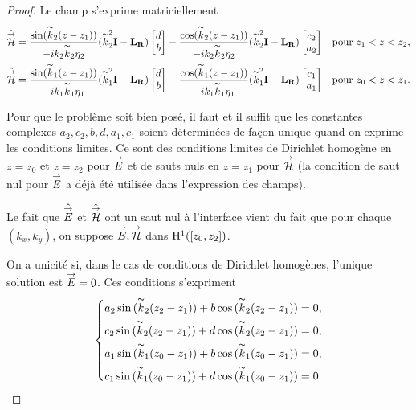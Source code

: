 \begin{proof}
      Le champ s'exprime matriciellement
      \begin{align*}
        \hat{\vH} &= \frac{\sin(\kk_2(z-z_1))}{-i k_2\kk_2 \eta_2}(\kk_2^2 \mI - \mLR)\begin{bmatrix}d \\ b\end{bmatrix} - \frac{\cos(\kk_2(z-z_1))}{-i k_2\kk_2 \eta_2}(\kk_2^2 \mI - \mLR)\begin{bmatrix}c_2 \\ a_2\end{bmatrix} && \text{pour } z_1 < z < z_2,
        \\
        \hat{\vH} &= \frac{\sin(\kk_1(z-z_1))}{-i k_1\kk_1 \eta_1}(\kk_1^2 \mI - \mLR)\begin{bmatrix}d \\ b\end{bmatrix} - \frac{\cos(\kk_1(z-z_1))}{-i k_1\kk_1 \eta_1}(\kk_1^2 \mI - \mLR)\begin{bmatrix}c_1 \\ a_1\end{bmatrix} && \text{pour } z_0 < z < z_1.
      \end{align*}

      Pour que le problème soit bien posé, il faut et il suffit que les constantes complexes \(a_2,c_2,b,d,a_1,c_1\) soient déterminées de façon unique quand on exprime les conditions limites. Ce sont des conditions limites de Dirichlet homogène en \(z=z_0\) et \(z=z_2\) pour \(\vE\) et de sauts nuls en \(z=z_1\) pour \(\vH\) (la condition de saut nul pour \(\vE\) a déjà été utilisée dans l'expression des champs).
      \begin{REM}
        Le fait que \(\hat{\vE}\) et \(\hat{\vH}\) ont un saut nul à l'interface vient du fait que pour chaque \((k_x,k_y)\), on suppose \(\vE,\vH\) dans \(\Sobup[1]{([z_0,z_2])}\).
      \end{REM}
      On a unicité si, dans le cas de conditions de Dirichlet homogènes, l'unique solution est \(\vE=0\). Ces conditions s'expriment
      \begin{equation*}
        \label{eq:unicite:interieur:2couches:cldirichlet}
        \left\lbrace
        \begin{aligned}
          a_2\sin{(\kk_2(z_2-z_1))} + b\cos{(\kk_2(z_2-z_1))} &= 0,
          \\
          c_2\sin{(\kk_2(z_2-z_1))} + d\cos{(\kk_2(z_2-z_1))} &= 0,
          \\
          a_1\sin{(\kk_1(z_0-z_1))} + b\cos{(\kk_1(z_0-z_1))} &= 0,
          \\
          c_1\sin{(\kk_1(z_0-z_1))} + d\cos{(\kk_1(z_0-z_1))} &= 0.
        \end{aligned}
        \right.
      \end{equation*}


\end{proof}
